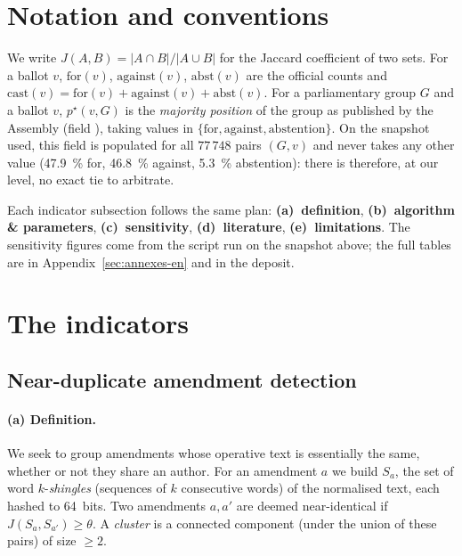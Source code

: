 \section{Notation and conventions}\label{sec:notations-en}
We write $J(A,B) = |A\cap B| / |A\cup B|$ for the Jaccard coefficient of two sets.
For a ballot $v$, $\mathrm{for}(v)$, $\mathrm{against}(v)$, $\mathrm{abst}(v)$ are
the official counts and $\text{cast}(v)=\mathrm{for}(v)+\mathrm{against}(v)+\mathrm{abst}(v)$.
For a parliamentary group $G$ and a ballot $v$, $p^\star(v,G)$ is the
\emph{majority position} of the group as published by the Assembly (field
), taking values in $\{\text{for},\text{against},\text{abstention}\}$.
On the snapshot used, this field is populated for all $77\,748$ pairs $(G,v)$ and
never takes any other value (47.9~\% \og{}for\fg{}, 46.8~\% \og{}against\fg{},
5.3~\% \og{}abstention\fg{}): there is therefore, at our level, no exact tie to
arbitrate.

Each indicator subsection follows the same plan: \textbf{(a)~definition},
\textbf{(b)~algorithm \& parameters}, \textbf{(c)~sensitivity}, \textbf{(d)~literature},
\textbf{(e)~limitations}. The sensitivity figures come from the script
 run on the snapshot above; the full tables are in
Appendix~\ref{sec:annexes-en} and in the deposit.

\section{The indicators}

\subsection{Near-duplicate amendment detection}\label{sec:clusters-en}

\paragraph{(a) Definition.} We seek to group amendments whose operative text is
\og{}essentially the same\fg{}, whether or not they share an author. For an
amendment $a$ we build $S_a$, the set of word $k$-\emph{shingles} (sequences of
$k$ consecutive words) of the normalised text, each hashed to 64~bits. Two
amendments $a,a'$ are deemed near-identical if $J(S_a,S_{a'})\ge\theta$. A
\emph{cluster} is a connected component (under the union of these pairs) of size
$\ge 2$.

